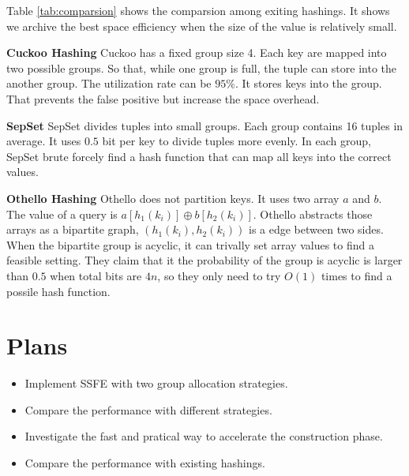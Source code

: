 \documentclass{article}
\begin{document}
Table \ref{tab:comparsion} shows the comparsion among exiting hashings. It shows we archive the best space efficiency when the size of the value is relatively small.

\textbf{Cuckoo Hashing} Cuckoo has a fixed group size 4. Each key are mapped into two possible groups. So that, while one group is full, the tuple can store into the another group. The utilization rate can be $95\%$. It stores keys into the group. That prevents the false positive but increase the space overhead.

\textbf{SepSet} SepSet divides tuples into small groups. Each group contains 16 tuples in average. It uses $0.5$ bit per key to divide tuples more evenly. In each group, SepSet brute forcely find a hash function that can map all keys into the correct values. 

\textbf{Othello Hashing} Othello does not partition keys. It uses two array $a$ and $b$. The value of a query is $a[h_1(k_i)] \oplus b[h_2(k_i)]$. Othello abstracts those arrays as a bipartite graph, $(h_1(k_i), h_2(k_i))$ is a edge between two sides. When the bipartite group is acyclic, it can trivally set array values to find a feasible setting. They claim that it the probability of the group is acyclic is larger than $0.5$ when total bits are $4n$, so they only need to try $O(1)$ times to find a possile hash function.

\section{Plans}

\begin{itemize}
    \item Implement SSFE with two group allocation strategies.
    \item Compare the performance with different strategies.
    \item Investigate the fast and pratical way to accelerate the construction phase.
    \item Compare the performance with existing hashings.
\end{itemize}



\end{document}
